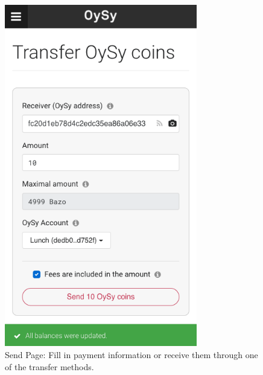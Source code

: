 \begin{figure}
\centering
\includegraphics[width=0.75\textwidth]{screenshots/Send-1.png}
\caption{\label{fig:uisend1}Send Page: Fill in payment information or receive them through one of the transfer methods.}
\end{figure}

